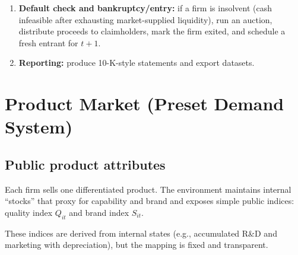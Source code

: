 \documentclass[11pt]{article}
\begin{document}
\begin{enumerate}[leftmargin=*]
    \textbf{Critical:} The environment must \emph{clamp} all LLM-requested expenditures to feasible levels before posting them.  The clamping order is:
    \begin{enumerate}[leftmargin=*]
        \item Compute available resources: beginning cash $+$ revenue collections $+$ net financing proceeds (equity issued $+$ debt issued $-$ debt repaid) $+$ available revolver commitment.
        \item Allocate to obligations in priority: (a) COGS (cost of goods actually sold), (b) interest on existing debt, (c) taxes due, (d) capex, R\&D, marketing (pro-rata if insufficient), (e) dividends and buybacks (only from remaining surplus).
        \item If total obligations exceed available resources even after full revolver draw, \emph{scale down} discretionary spending (capex, R\&D, marketing, payouts) to fit.  Record the \emph{actual} (clamped) amounts on the financial statements, not the LLM's raw requests.
    \end{enumerate}
    After clamping, $\text{Cash}_{it}\ge 0$ must hold for any non-defaulted firm.  If it still does not (e.g., mandatory costs exceed all resources), the firm defaults.
    \item \textbf{Default check and bankruptcy/entry:} if a firm is insolvent (cash infeasible after exhausting market-supplied liquidity), run an auction, distribute proceeds to claimholders, mark the firm exited, and schedule a fresh entrant for $t+1$.
    \item \textbf{Reporting:} produce 10-K-style statements and export datasets.
\end{enumerate}

\section{Product Market (Preset Demand System)}

\subsection{Public product attributes}
Each firm sells one differentiated product. The environment maintains internal ``stocks'' that proxy for capability and brand and exposes simple public indices:
quality index $Q_{it}$ and brand index $S_{it}$.

These indices are derived from internal states (e.g., accumulated R\&D and marketing with depreciation), but the mapping is fixed and transparent.
\end{document}

